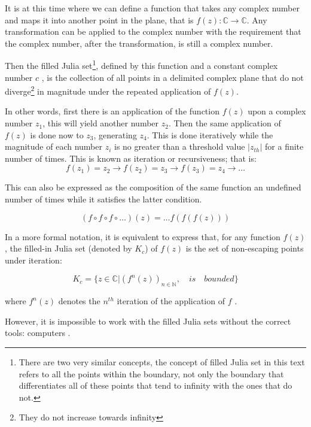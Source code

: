 \documentclass{article}
\begin{document}
It is at this time where we can define a function that takes any complex number and maps it into another point in the plane, that is $f(z):\mathbb{C}\rightarrow \mathbb{C}$. Any transformation can be applied to the complex number with the requirement that the complex number, after the transformation, is still a complex number.

Then the filled Julia set\footnote{There are two very similar concepts, the concept of filled Julia set in this text refers to all the points within the boundary,  not only the boundary that differentiates all of these points that tend to infinity with the ones that do not.}, defined by this function and a constant complex number $c$ , is the collection of all points in a delimited complex plane that do not diverge\footnote{They do not increase towards infinity} in magnitude under the repeated application of $f(z)$\cite{csc}.

In other words, first there is an application of the function $f(z)$ upon a complex number $z_1$, this will yield another number $z_2$. Then the same application of $f(z)$ is done now to $z_3$, generating $z_4$. This is done iteratively while the magnitude of each number $z_i$ is no greater than a threshold value $|z_{th}|$ for a finite number of times\cite{coursera}. This is known as iteration or recursiveness; that is:
\begin{equation}
    f(z_1)=z_2 \longrightarrow f(z_2)=z_3 \longrightarrow f(z_3)=z_4 \longrightarrow \dots
\end{equation}

This can also be expressed as the composition of the same function an undefined number of times while it satisfies the latter condition.

\begin{equation}
    (f\circ f \circ f \circ \dots )(z) = \dots f(f(f(z)))
\end{equation}

In a more formal notation, it is equivalent to express that, for any function $f(z)$, the filled-in Julia set (denoted by $K_c$) of $f(z)$ is the set of non-escaping points under iteration:

\begin{equation}
    K_c = \{z \in \mathbb{C}| (f^n(z))_{n \in \mathbb{N}}, \quad is \quad bounded\}
\end{equation}

where $f^n(z)$ denotes the $n^{th}$ iteration of the application of $f$ \cite{Lei}.

However, it is impossible to work with the filled Julia sets without the correct tools: computers \cite{Devaney}.
\end{document}
